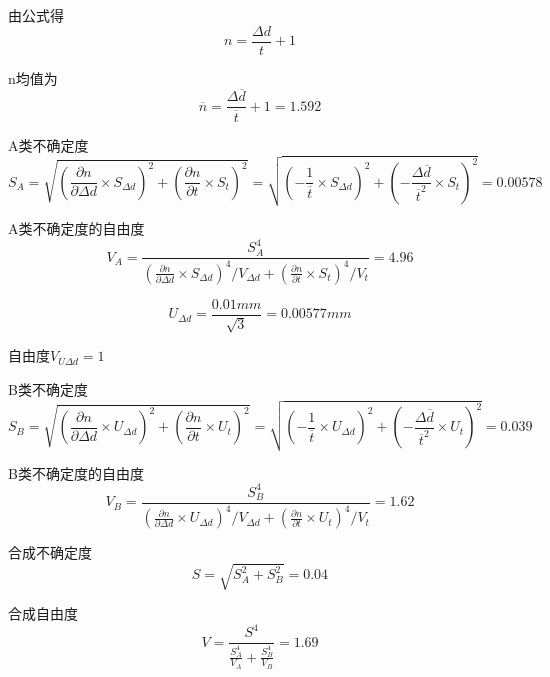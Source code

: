 \documentclass[12pt,a4paper,UTF8]{ctexart}
\begin{document}
由公式得
\begin{equation*}
	n=\frac{\varDelta d}{t}+1
\end{equation*}

n均值为
\begin{equation*}
	\overline{n}=\frac{\varDelta\overline{d}}{\overline{t}}+1=1.592
\end{equation*}


A类不确定度
\begin{equation*}
	S_A=\sqrt{{\left( \frac{\partial n}{\partial \varDelta d}\times S_{\varDelta d}\right) }^2+{\left( \frac{\partial n}{\partial t}\times S_{t}\right) }^2}=
	\sqrt{{\left( -\frac{1}{\overline{t}}\times S_{\varDelta d}\right) }^2+{\left( -\frac{\varDelta\overline{d}}{\overline{t}^2}\times S_{t}\right) }^2}=0.00578
\end{equation*}

A类不确定度的自由度
\begin{equation*}
	V_A=\frac{S_A^4}{{\left( \frac{\partial n}{\partial \varDelta d}\times S_{\varDelta d}\right) }^4/V_{\varDelta d}+{\left( \frac{\partial n}{\partial t}\times S_{t}\right) }^4/V_t}=4.96
\end{equation*}

\begin{equation*}
	U_{\varDelta d}=\frac{0.01mm}{\sqrt{3}}=0.00577mm
\end{equation*}

自由度$V_{U \varDelta d}=1$

B类不确定度
\begin{equation*}
	S_B=\sqrt{{\left( \frac{\partial n}{\partial \varDelta d}\times U_{\varDelta d}\right) }^2+{\left( \frac{\partial n}{\partial t}\times U_{t}\right) }^2}=
	\sqrt{{\left( -\frac{1}{\overline{t}}\times U_{\varDelta d}\right) }^2+{\left( -\frac{\varDelta\overline{d}}{\overline{t}^2}\times U_{t}\right) }^2}=0.039
\end{equation*}

B类不确定度的自由度
\begin{equation*}
	V_B=\frac{S_B^4}{{\left( \frac{\partial n}{\partial \varDelta d}\times U_{\varDelta d}\right) }^4/V_{\varDelta d}+{\left( \frac{\partial n}{\partial t}\times U_{t}\right) }^4/V_t}=1.62
\end{equation*}

合成不确定度
\begin{equation*}
	S= \sqrt{S_A^2+S_B^2}=0.04
\end{equation*}

合成自由度
\begin{equation*}
	V=\frac{S^4}{ \frac{S_A^4}{V_A}+ \frac{S_B^4}{V_B}}=1.69
\end{equation*}
\end{document}
